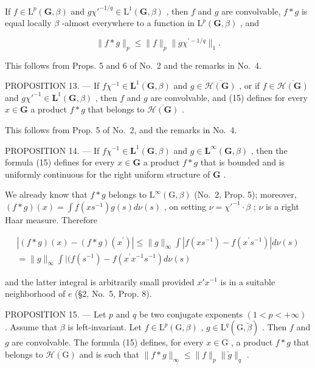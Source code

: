 If \(f \in \mathrm{L}^p(\mathbf{G},\beta)\) and \(g\chi'^{-1/q} \in \mathrm{L}^1(\mathbf{G},\beta)\) , then \(f\) and \(g\) are convolvable, \(f * g\) is equal locally \(\beta\) -almost everywhere to a function in \(\mathrm{L}^p(\mathbf{G},\beta)\) , and

\[
\| f * g \| _ {p} \leqslant \| f \| _ {p} \| g \chi^ {\prime - 1 / q} \| _ {1}.
\]

This follows from Props. 5 and 6 of No.~2 and the remarks in No.~4.

PROPOSITION 13. --- If \(f\chi^{-1} \in \mathbf{L}^1(\mathbf{G}, \beta)\) and \(g \in \overline{\mathcal{H}(\mathbf{G})}\) , or if \(f \in \overline{\mathcal{H}(\mathbf{G})}\) and \(g\chi'^{-1} \in \mathbf{L}^1(\mathbf{G}, \beta)\) , then \(f\) and \(g\) are convolvable, and (15) defines for every \(x \in \mathbf{G}\) a product \(f * g\) that belongs to \(\overline{\mathcal{H}(\mathbf{G})}\) .

This follows from Prop. 5 of No.~2, and the remarks in No.~4.

PROPOSITION 14. --- If \(f\chi^{-1} \in \mathbf{L}^1(\mathbf{G}, \beta)\) and \(g \in \mathbf{L}^\infty(\mathbf{G}, \beta)\) , then the formula (15) defines for every \(x \in \mathbf{G}\) a product \(f * g\) that is bounded and is uniformly continuous for the right uniform structure of \(\mathbf{G}\) .

We already know that \(f * g\) belongs to \(\mathrm{L}^{\infty}(\mathrm{G},\beta)\) (No.~2, Prop. 5); moreover, \((f*g)(x) = \int f(xs^{-1})g(s)d\nu(s)\) , on setting \(\nu = \chi'^{-1}\cdot \beta\) ; \(\nu\) is a right Haar measure. Therefore

\[
\begin{array}{c} | (f * g) (x) - (f * g) (x ^ {\prime}) | \leqslant \| g \| _ {\infty} \int | f (x s ^ {- 1}) - f (x ^ {\prime} s ^ {- 1}) | d \nu (s) \\ = \| g \| _ {\infty} \int | (f (s ^ {- 1}) - f (x ^ {\prime} x ^ {- 1} s ^ {- 1}) d \nu (s) \end{array}
\]

and the latter integral is arbitrarily small provided \(x'x^{-1}\) is in a suitable neighborhood of \(e\) (§2, No.~5, Prop. 8).

PROPOSITION 15. --- Let \(p\) and \(q\) be two conjugate exponents \((1 < p < +\infty)\) . Assume that \(\beta\) is left-invariant. Let \(f \in \mathrm{L}^p(\mathrm{G}, \beta)\) , \(g \in \mathrm{L}^q(\mathrm{G}, \breve{\beta})\) . Then \(f\) and \(g\) are convolvable. The formula (15) defines, for every \(x \in \mathrm{G}\) , a product \(f * g\) that belongs to \(\overline{\mathcal{H}(\mathrm{G})}\) and is such that \(\| f * g \|_{\infty} \leqslant \| f \|_p \| \breve{g} \|_q\) .


